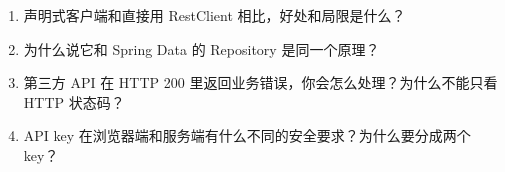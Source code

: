 \begin{think}
\begin{enumerate}
  \item {} 声明式客户端和直接用 RestClient 相比，好处和局限是什么？
  \item 为什么说它和 Spring Data 的 Repository 是同一个原理？
  \item 第三方 API 在 HTTP 200 里返回业务错误，你会怎么处理？为什么不能只看 HTTP 状态码？
  \item API key 在浏览器端和服务端有什么不同的安全要求？为什么要分成两个 key？
\end{enumerate}
\end{think}
